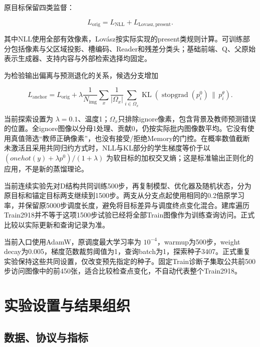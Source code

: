 \documentclass[UTF8,a4paper,zihao=-4,fontset=none]{ctexart}
\begin{document}
原目标保留四类监督：

\begin{equation}
\label{eq:10}
L_{\mathrm{orig}}=L_{\mathrm{NLL}}+L_{\mathrm{Lovasz,present}}.
\end{equation}

其中NLL使用全部有效像素，Lovász按实际实现的present类规则计算。可训练部分包括像素与父区域投影、槽编码、Reader和残差分类头；基础前端、Q、父原始表示生成器、支持内容与外部检索选择均固定。

为检验输出偏离与预测退化的关系，候选分支增加

\begin{equation}
\label{eq:11}
L_{\mathrm{anchor}}=L_{\mathrm{orig}}
+\lambda\frac{1}{N_{\mathrm{img}}}\sum_x\frac{1}{|\Omega_x|}
\sum_{i\in\Omega_x}\operatorname{KL}\!\left(
\operatorname{stopgrad}(p_i^0)\,\|\,p_i^\theta\right).
\end{equation}

当前探索设置为 \(\lambda = 0.1\)、温度1；\(\Omega_{x}\)只排除ignore像素，包含背景及教师预测错误的位置。全ignore图像以分母1处理、贡献0，仍按实际批内图像数平均。它没有使用真值筛选``教师正确像素''，也没有接受/拒绝Memory的门控。在概率数值截断未激活且采用共同归约方式时，NLL与KL部分的学生梯度等价于以 \(\left( onehot(y) + \lambda p^{0} \right)/(1 + \lambda)\) 为软目标的加权交叉熵；这是标准输出正则化的应用，不是新的蒸馏理论。

当前连续实验先对D结构共同训练500步，再复制模型、优化器及随机状态，分为原目标和锚定目标两支继续到1500步。两支从分支点起使用相同的0.2倍原学习率，并保留原5000步调度长度，避免将目标差异与调度终点变化混合。建库遍历Train2918并不等于这项1500步试验已经将全部Train图像作为训练查询访问。正式比较以实际更新和查询记录为准。

当前入口使用AdamW，原调度最大学习率为 \(10^{- 4}\)，warmup为500步，weight decay为0.005，梯度范数裁剪阈值为1，查询batch为1，探索种子3407。正式重复实验保持这些共同设置，仅改变预先指定的种子。固定Train诊断子集取公共前500步访问图像中的前450张，适合比较检查点变化，不自动代表整个Train2918。
\section{实验设置与结果组织}

\label{sec:experiments}

\FloatBarrier

\subsection{数据、协议与指标}
\end{document}
